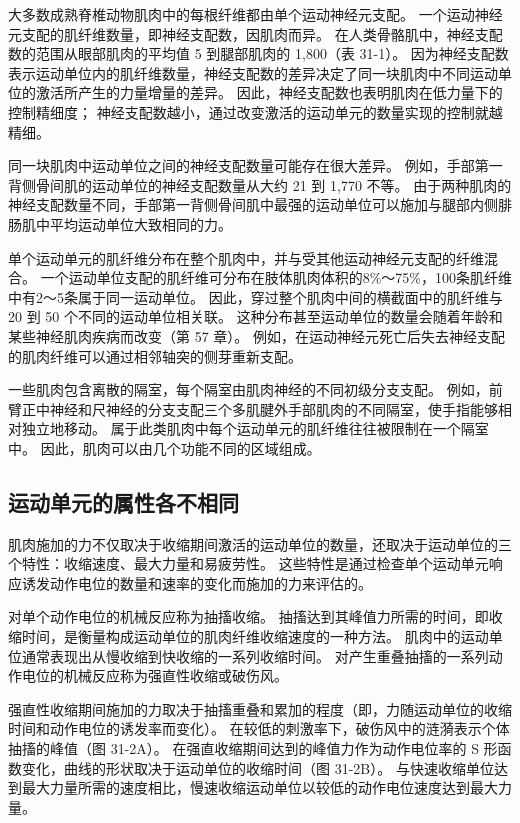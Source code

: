 大多数成熟脊椎动物肌肉中的每根纤维都由单个运动神经元支配。 一个运动神经元支配的肌纤维数量，即神经支配数，因肌肉而异。 在人类骨骼肌中，神经支配数的范围从眼部肌肉的平均值 5 到腿部肌肉的 1,800（表 31-1）。 因为神经支配数表示运动单位内的肌纤维数量，神经支配数的差异决定了同一块肌肉中不同运动单位的激活所产生的力量增量的差异。 因此，神经支配数也表明肌肉在低力量下的控制精细度； 神经支配数越小，通过改变激活的运动单元的数量实现的控制就越精细。

同一块肌肉中运动单位之间的神经支配数量可能存在很大差异。 例如，手部第一背侧骨间肌的运动单位的神经支配数量从大约 21 到 1,770 不等。 由于两种肌肉的神经支配数量不同，手部第一背侧骨间肌中最强的运动单位可以施加与腿部内侧腓肠肌中平均运动单位大致相同的力。

单个运动单元的肌纤维分布在整个肌肉中，并与受其他运动神经元支配的纤维混合。 一个运动单位支配的肌纤维可分布在肢体肌肉体积的8\%～75\%，100条肌纤维中有2～5条属于同一运动单位。 因此，穿过整个肌肉中间的横截面中的肌纤维与 20 到 50 个不同的运动单位相关联。 这种分布甚至运动单位的数量会随着年龄和某些神经肌肉疾病而改变（第 57 章）。 例如，在运动神经元死亡后失去神经支配的肌肉纤维可以通过相邻轴突的侧芽重新支配。

一些肌肉包含离散的隔室，每个隔室由肌肉神经的不同初级分支支配。 例如，前臂正中神经和尺神经的分支支配三个多肌腱外手部肌肉的不同隔室，使手指能够相对独立地移动。 属于此类肌肉中每个运动单元的肌纤维往往被限制在一个隔室中。 因此，肌肉可以由几个功能不同的区域组成。

\subsection{运动单元的属性各不相同}
肌肉施加的力不仅取决于收缩期间激活的运动单位的数量，还取决于运动单位的三个特性：收缩速度、最大力量和易疲劳性。 这些特性是通过检查单个运动单元响应诱发动作电位的数量和速率的变化而施加的力来评估的。

对单个动作电位的机械反应称为抽搐收缩。 抽搐达到其峰值力所需的时间，即收缩时间，是衡量构成运动单位的肌肉纤维收缩速度的一种方法。 肌肉中的运动单位通常表现出从慢收缩到快收缩的一系列收缩时间。 对产生重叠抽搐的一系列动作电位的机械反应称为强直性收缩或破伤风。

强直性收缩期间施加的力取决于抽搐重叠和累加的程度（即，力随运动单位的收缩时间和动作电位的诱发率而变化）。 在较低的刺激率下，破伤风中的涟漪表示个体抽搐的峰值（图 31-2A）。 在强直收缩期间达到的峰值力作为动作电位率的 S 形函数变化，曲线的形状取决于运动单位的收缩时间（图 31-2B）。 与快速收缩单位达到最大力量所需的速度相比，慢速收缩运动单位以较低的动作电位速度达到最大力量。

